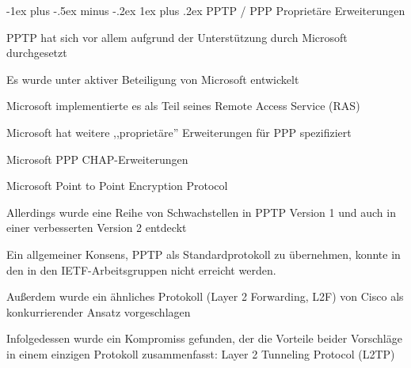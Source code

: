 \documentclass[a4paper]{article}
\makeatletter
\renewcommand{\subsubsection}{\@startsection{subsubsection}{3}{0mm}%
 {-1ex plus -.5ex minus -.2ex}%
 {1ex plus .2ex}%
 {\normalfont\small\bfseries}}
\makeatother
\begin{document}
\begin{multicols}{3}
      \subsubsection{PPTP / PPP Proprietäre Erweiterungen}
      \begin{itemize*}
            \item PPTP hat sich vor allem aufgrund der Unterstützung durch Microsoft durchgesetzt
            \begin{itemize*}
                  \item Es wurde unter aktiver Beteiligung von Microsoft entwickelt
                  \item Microsoft implementierte es als Teil seines Remote Access Service (RAS)
            \end{itemize*}
            \item Microsoft hat weitere ,,proprietäre'' Erweiterungen für PPP spezifiziert
            \begin{itemize*}
                  \item Microsoft PPP CHAP-Erweiterungen
                  \item Microsoft Point to Point Encryption Protocol
            \end{itemize*}
            \item Allerdings wurde eine Reihe von Schwachstellen in PPTP Version 1 und auch in einer verbesserten Version 2 entdeckt
            \begin{itemize*}
                  \item Ein allgemeiner Konsens, PPTP als Standardprotokoll zu übernehmen, konnte in den in den IETF-Arbeitsgruppen nicht erreicht werden.
                  \item Außerdem wurde ein ähnliches Protokoll (Layer 2 Forwarding, L2F) von Cisco als konkurrierender Ansatz vorgeschlagen
                  \item Infolgedessen wurde ein Kompromiss gefunden, der die Vorteile beider Vorschläge in einem einzigen Protokoll zusammenfasst: Layer 2 Tunneling Protocol (L2TP)
            \end{itemize*}
      \end{itemize*}


\end{multicols}
\end{document}
